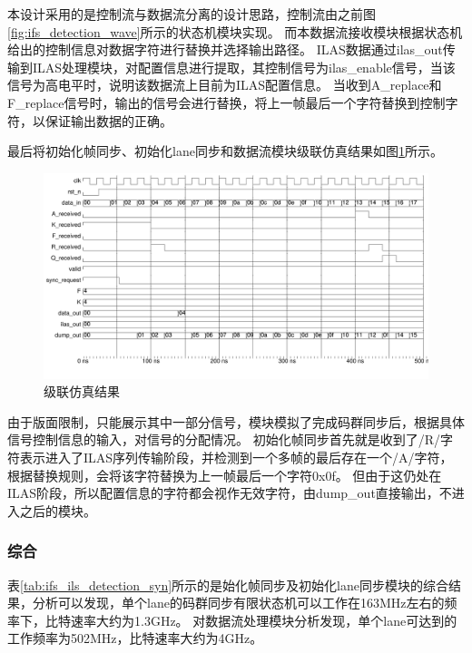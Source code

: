 \documentclass[UTF8]{ctexart}
\begin{document}
本设计采用的是控制流与数据流分离的设计思路，控制流由之前图\ref{fig:ifs_detection_wave}所示的状态机模块实现。
而本数据流接收模块根据状态机给出的控制信息对数据字符进行替换并选择输出路径。
ILAS数据通过ilas\_out传输到ILAS处理模块，对配置信息进行提取，其控制信号为ilas\_enable信号，当该信号为高电平时，说明该数据流上目前为ILAS配置信息。
当收到A\_replace和F\_replace信号时，输出的信号会进行替换，将上一帧最后一个字符替换到控制字符，以保证输出数据的正确。

最后将初始化帧同步、初始化lane同步和数据流模块级联仿真结果如图\ref{fig:recv_top_wave}所示。

\begin{figure}[H]
	\centering
	\includegraphics[width=18cm]{./img/recv_top_wave.pdf}
	\caption{级联仿真结果}
	\label{fig:recv_top_wave}
\end{figure}

由于版面限制，只能展示其中一部分信号，模块模拟了完成码群同步后，根据具体信号控制信息的输入，对信号的分配情况。
初始化帧同步首先就是收到了/R/字符表示进入了ILAS序列传输阶段，并检测到一个多帧的最后存在一个/A/字符，根据替换规则，会将该字符替换为上一帧最后一个字符0x0f。
但由于这仍处在ILAS阶段，所以配置信息的字符都会视作无效字符，由dump\_out直接输出，不进入之后的模块。

\subsubsection{综合}

表\ref{tab:ifs_ils_detection_syn}所示的是始化帧同步及初始化lane同步模块的综合结果，分析可以发现，单个lane的码群同步有限状态机可以工作在163MHz左右的频率下，比特速率大约为1.3GHz。
对数据流处理模块分析发现，单个lane可达到的工作频率为502MHz，比特速率大约为4GHz。
\end{document}
